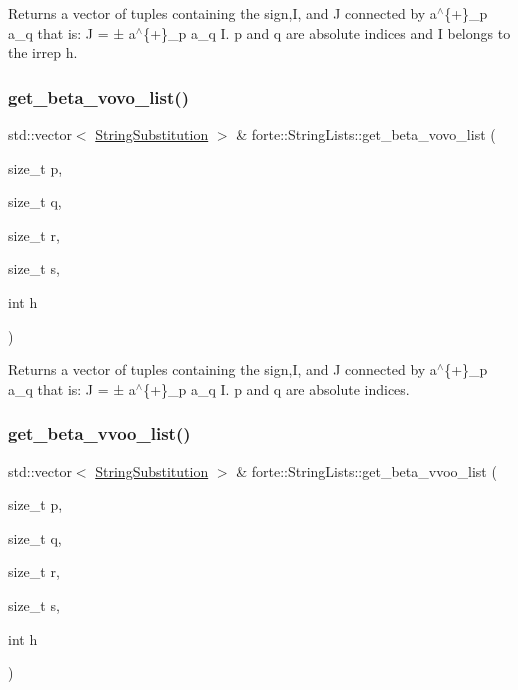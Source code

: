 Returns a vector of tuples containing the sign,I, and J connected by a$^\wedge$\{+\}\+\_\+p a\+\_\+q that is\+: J = ± a$^\wedge$\{+\}\+\_\+p a\+\_\+q I. p and q are absolute indices and I belongs to the irrep h. \mbox{\label{classforte_1_1_string_lists_aec1c0e66083e28ab65db2328c95747eb}} 
\subsubsection{\texorpdfstring{get\+\_\+beta\+\_\+vovo\+\_\+list()}{get\_beta\_vovo\_list()}}
{\footnotesize\ttfamily std\+::vector$<$ \mbox{\hyperlink{structforte_1_1_string_substitution}{String\+Substitution}} $>$ \& forte\+::\+String\+Lists\+::get\+\_\+beta\+\_\+vovo\+\_\+list (\begin{DoxyParamCaption}\item[{size\+\_\+t}]{p,  }\item[{size\+\_\+t}]{q,  }\item[{size\+\_\+t}]{r,  }\item[{size\+\_\+t}]{s,  }\item[{int}]{h }\end{DoxyParamCaption})}

Returns a vector of tuples containing the sign,I, and J connected by a$^\wedge$\{+\}\+\_\+p a\+\_\+q that is\+: J = ± a$^\wedge$\{+\}\+\_\+p a\+\_\+q I. p and q are absolute indices. \mbox{\label{classforte_1_1_string_lists_a6546883e1e65cf13d0920babf82f0191}} 
\subsubsection{\texorpdfstring{get\+\_\+beta\+\_\+vvoo\+\_\+list()}{get\_beta\_vvoo\_list()}}
{\footnotesize\ttfamily std\+::vector$<$ \mbox{\hyperlink{structforte_1_1_string_substitution}{String\+Substitution}} $>$ \& forte\+::\+String\+Lists\+::get\+\_\+beta\+\_\+vvoo\+\_\+list (\begin{DoxyParamCaption}\item[{size\+\_\+t}]{p,  }\item[{size\+\_\+t}]{q,  }\item[{size\+\_\+t}]{r,  }\item[{size\+\_\+t}]{s,  }\item[{int}]{h }\end{DoxyParamCaption})}

